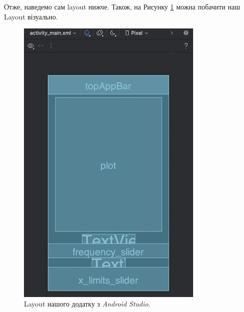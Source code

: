 \documentclass[oneside,solution]{android-assign}
\begin{document}
Отже, наведемо сам layout нижче. Також, на Рисунку \ref{fig:layout} можна побачити наш Layout візуально.
\begin{figure}
    \centering
    \includegraphics[width=0.8\textwidth]{screenshots/layout.png}
    \caption{Layout нашого додатку з \textit{Android Studio}.}
    \label{fig:layout}
\end{figure}
\end{document}
